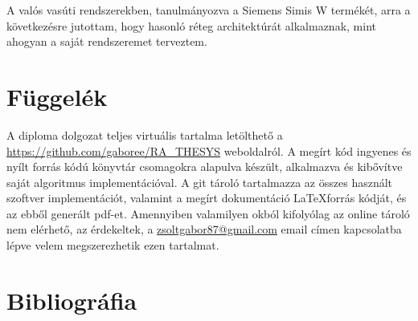 \documentclass[a4paper,12pt]{article}
\begin{document}
A valós vasúti rendszerekben, tanulmányozva a Siemens Simis W termékét, arra a következésre jutottam, hogy hasonló réteg architektúrát alkalmaznak, mint ahogyan a saját rendszeremet terveztem.

\newpage
\section{Függelék}
A diploma dolgozat teljes virtuális tartalma letölthető a \url{https://github.com/gaboree/RA_THESYS} weboldalról.
A megírt kód ingyenes és nyílt  forrás kódú könyvtár csomagokra alapulva készült, alkalmazva és kibővítve saját algoritmus implementációval.  
A git tároló tartalmazza az összes használt szoftver implementációt, valamint a megírt dokumentáció \LaTeX forrás kódját, és az ebből generált pdf-et.
Amennyiben valamilyen okból kifolyólag az online tároló nem elérhető, az érdekeltek, a \url{zsoltgabor87@gmail.com} email címen kapcsolatba lépve velem megszerezhetik ezen tartalmat.


\newpage
\section{Bibliográfia}
	\begingroup
	\renewcommand{\section}[2]{}
	\renewcommand{\markboth}[2]{}
		
		
	\endgroup

	
\newpage

\newpage

\end{document}
